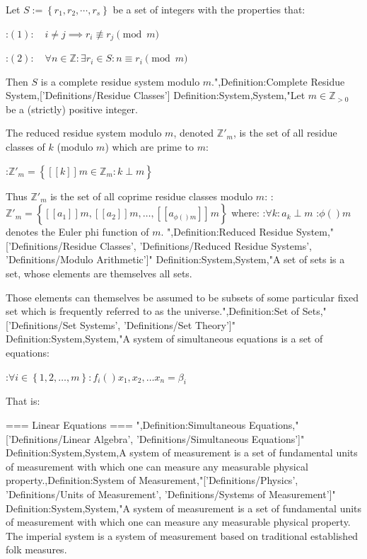 Let $S := \left\lbrace r_1, r_2, \dotsb, r_s \right\rbrace$ be a set of integers with the properties that:

:$(1): \quad i \ne j \implies r_i \not \equiv r_j \pmod m$

:$(2): \quad \forall n \in \mathbb Z: \exists r_i \in S: n \equiv r_i \pmod m$


Then $S$ is a complete residue system modulo $m$.",Definition:Complete Residue System,['Definitions/Residue Classes']
Definition:System,System,"Let $m \in \mathbb Z_{> 0}$ be a (strictly) positive integer.


The reduced residue system modulo $m$, denoted $\mathbb Z'_m$, is the set of all residue classes of $k$ (modulo $m$) which are prime to $m$:

:$\mathbb Z'_m = \left\lbrace \left[\!\left[ k \right]\!\right]_{ }m \in \mathbb Z_m: k \perp m \right\rbrace$


Thus $\mathbb Z'_m$ is the set of all coprime residue classes modulo $m$:
:$\mathbb Z'_m = \left\lbrace \left[\!\left[ a_1 \right]\!\right]_{ }m, \left[\!\left[ a_2 \right]\!\right]_{ }m, \ldots, \left[\!\left[ a_{\phi \left(   \right)m}  \right]\!\right]_{ }m \right\rbrace$
where:
:$\forall k: a_k \perp m$
:$\phi \left(   \right)m$ denotes the Euler phi function of $m$.
",Definition:Reduced Residue System,"['Definitions/Residue Classes', 'Definitions/Reduced Residue Systems', 'Definitions/Modulo Arithmetic']"
Definition:System,System,"A set of sets is a set, whose elements are themselves all sets.


Those elements can themselves be assumed to be subsets of some particular fixed set which is frequently referred to as the universe.",Definition:Set of Sets,"['Definitions/Set Systems', 'Definitions/Set Theory']"
Definition:System,System,"A system of simultaneous equations is a set of equations:

:$\forall i \in \left\lbrace 1, 2, \ldots, m \right\rbrace : f_i \left(   \right){x_1, x_2, \ldots x_n} = \beta_i$


That is:









=== Linear Equations ===
",Definition:Simultaneous Equations,"['Definitions/Linear Algebra', 'Definitions/Simultaneous Equations']"
Definition:System,System,A system of measurement is a set of fundamental units of measurement with which one can measure any measurable physical property.,Definition:System of Measurement,"['Definitions/Physics', 'Definitions/Units of Measurement', 'Definitions/Systems of Measurement']"
Definition:System,System,"A system of measurement is a set of fundamental units of measurement with which one can measure any measurable physical property.
The imperial system is a system of measurement based on traditional established folk measures.


